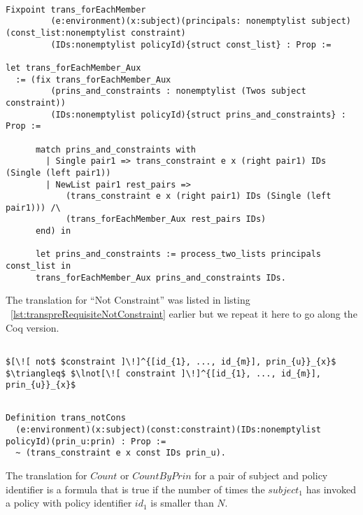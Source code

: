 \begin{lstlisting}

Fixpoint trans_forEachMember
         (e:environment)(x:subject)(principals: nonemptylist subject)(const_list:nonemptylist constraint)
         (IDs:nonemptylist policyId){struct const_list} : Prop := 

let trans_forEachMember_Aux   
  := (fix trans_forEachMember_Aux
         (prins_and_constraints : nonemptylist (Twos subject constraint))
         (IDs:nonemptylist policyId){struct prins_and_constraints} : Prop :=

      match prins_and_constraints with
        | Single pair1 => trans_constraint e x (right pair1) IDs (Single (left pair1)) 
        | NewList pair1 rest_pairs =>
            (trans_constraint e x (right pair1) IDs (Single (left pair1))) /\
            (trans_forEachMember_Aux rest_pairs IDs)
      end) in

      let prins_and_constraints := process_two_lists principals const_list in
      trans_forEachMember_Aux prins_and_constraints IDs.

\end{lstlisting}


The translation for ``Not Constraint'' was listed in listing ~\ref{lst:transpreRequisiteNotConstraint} earlier but we repeat it here to go along the Coq version. 

\lstset{mathescape, language=AST}  
\begin{lstlisting}[frame=single, caption={Not Constraint Translation},label={lst:transnotCons}]

$[\![ not$ $constraint ]\!]^{[id_{1}, ..., id_{m}], prin_{u}}_{x}$ $\triangleq$ $\lnot[\![ constraint ]\!]^{[id_{1}, ..., id_{m}], prin_{u}}_{x}$ 

\end{lstlisting}

\begin{lstlisting}

Definition trans_notCons
  (e:environment)(x:subject)(const:constraint)(IDs:nonemptylist policyId)(prin_u:prin) : Prop :=
  ~ (trans_constraint e x const IDs prin_u).
\end{lstlisting}

The translation for $Count$ or $CountByPrin$ for a pair of subject and policy identifier is a formula that is true if the number of times the $subject_{1}$ has invoked a policy with policy identifier $id_{1}$ is smaller than $N$.

